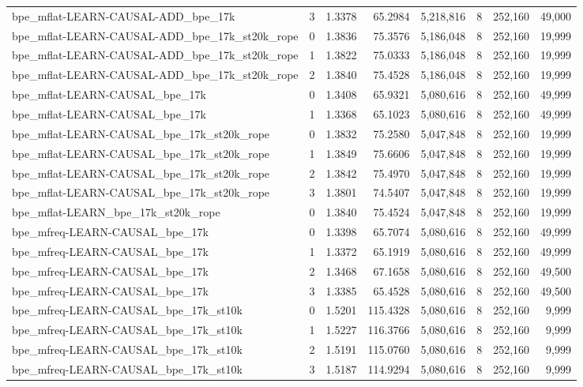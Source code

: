 \begin{tabular}{lrrrrrrr}
bpe\_mflat-LEARN-CAUSAL-ADD\_bpe\_17k & 3 & 1.3378 & 65.2984 & 5,218,816 & 8 & 252,160 & 49,000 \\
bpe\_mflat-LEARN-CAUSAL-ADD\_bpe\_17k\_st20k\_rope & 0 & 1.3836 & 75.3576 & 5,186,048 & 8 & 252,160 & 19,999 \\
bpe\_mflat-LEARN-CAUSAL-ADD\_bpe\_17k\_st20k\_rope & 1 & 1.3822 & 75.0333 & 5,186,048 & 8 & 252,160 & 19,999 \\
bpe\_mflat-LEARN-CAUSAL-ADD\_bpe\_17k\_st20k\_rope & 2 & 1.3840 & 75.4528 & 5,186,048 & 8 & 252,160 & 19,999 \\
bpe\_mflat-LEARN-CAUSAL\_bpe\_17k & 0 & 1.3408 & 65.9321 & 5,080,616 & 8 & 252,160 & 49,999 \\
bpe\_mflat-LEARN-CAUSAL\_bpe\_17k & 1 & 1.3368 & 65.1023 & 5,080,616 & 8 & 252,160 & 49,999 \\
bpe\_mflat-LEARN-CAUSAL\_bpe\_17k\_st20k\_rope & 0 & 1.3832 & 75.2580 & 5,047,848 & 8 & 252,160 & 19,999 \\
bpe\_mflat-LEARN-CAUSAL\_bpe\_17k\_st20k\_rope & 1 & 1.3849 & 75.6606 & 5,047,848 & 8 & 252,160 & 19,999 \\
bpe\_mflat-LEARN-CAUSAL\_bpe\_17k\_st20k\_rope & 2 & 1.3842 & 75.4970 & 5,047,848 & 8 & 252,160 & 19,999 \\
bpe\_mflat-LEARN-CAUSAL\_bpe\_17k\_st20k\_rope & 3 & 1.3801 & 74.5407 & 5,047,848 & 8 & 252,160 & 19,999 \\
bpe\_mflat-LEARN\_bpe\_17k\_st20k\_rope & 0 & 1.3840 & 75.4524 & 5,047,848 & 8 & 252,160 & 19,999 \\
bpe\_mfreq-LEARN-CAUSAL\_bpe\_17k & 0 & 1.3398 & 65.7074 & 5,080,616 & 8 & 252,160 & 49,999 \\
bpe\_mfreq-LEARN-CAUSAL\_bpe\_17k & 1 & 1.3372 & 65.1919 & 5,080,616 & 8 & 252,160 & 49,999 \\
bpe\_mfreq-LEARN-CAUSAL\_bpe\_17k & 2 & 1.3468 & 67.1658 & 5,080,616 & 8 & 252,160 & 49,500 \\
bpe\_mfreq-LEARN-CAUSAL\_bpe\_17k & 3 & 1.3385 & 65.4528 & 5,080,616 & 8 & 252,160 & 49,500 \\
bpe\_mfreq-LEARN-CAUSAL\_bpe\_17k\_st10k & 0 & 1.5201 & 115.4328 & 5,080,616 & 8 & 252,160 & 9,999 \\
bpe\_mfreq-LEARN-CAUSAL\_bpe\_17k\_st10k & 1 & 1.5227 & 116.3766 & 5,080,616 & 8 & 252,160 & 9,999 \\
bpe\_mfreq-LEARN-CAUSAL\_bpe\_17k\_st10k & 2 & 1.5191 & 115.0760 & 5,080,616 & 8 & 252,160 & 9,999 \\
bpe\_mfreq-LEARN-CAUSAL\_bpe\_17k\_st10k & 3 & 1.5187 & 114.9294 & 5,080,616 & 8 & 252,160 & 9,999 \\

\end{tabular}
